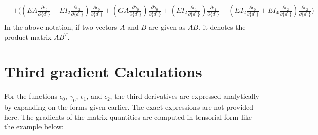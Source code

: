 \documentclass[10pt]{article}
\begin{document}
\begin{align}
                                                &+ \Biggl((EA\frac{\partial \epsilon_0}{\partial \{d^e\}} +
                                                  EI_2\frac{\partial \epsilon_2}{\partial \{d^e\}})            
                                                  \frac{\partial
                                                  \epsilon_0}{\partial
                                                  \{d^e\}} +
                                                  (GA\frac{\partial \gamma_0}{\partial \{d^e\}})
                                                  \frac{\partial
                                                  \gamma_0}{\partial
                                                  \{d^e\}} +
                                                  (EI_2\frac{\partial \epsilon_1}{\partial \{d^e\}})
                                                  \frac{\partial
                                                  \epsilon_1}{\partial
                                                  \{d^e\}}
                                                + (EI_2\frac{\partial \epsilon_0}{\partial \{d^e\}}
                                                  +EI_4\frac{\partial \epsilon_2}{\partial \{d^e\}})
                                                  \frac{\partial
                                                  \epsilon_2}
                                                  {\partial
                                                  \{ d^e \}}\Biggr)\nonumber\\
  \label{eq:udiffs}
\end{align}
In the above notation, if two vectors $A$ and $B$ are given as $AB$,
it denotes the product matrix $AB^T$.

\section{Third gradient Calculations}
\label{sec:third-grad-calc}

For the functions $\epsilon_0$, $\gamma_0$, $\epsilon_1$, and
$\epsilon_2$, the third derivatives are expressed analytically by
expanding on the forms given earlier. The exact expressions are not
provided here. The gradients of the matrix quantities are computed in
tensorial form like the example below:
\end{document}
